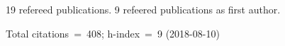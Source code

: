 19 refereed publications. 9 refeered publications as first author.

               Total citations~=~408; h-index~=~9 (2018-08-10)